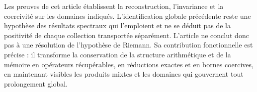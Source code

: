 Les preuves de cet article établissent la reconstruction, l'invariance et la coercivité sur les domaines indiqués. L'identification globale précédente reste une hypothèse des résultats spectraux qui l'emploient et ne se déduit pas de la positivité de chaque collection transportée séparément. L'article ne conclut donc pas à une résolution de l'hypothèse de Riemann. Sa contribution fonctionnelle est précise : il transforme la conservation de la structure arithmétique et de la mémoire en opérateurs récupérables, en réductions exactes et en bornes coercives, en maintenant visibles les produits mixtes et les domaines qui gouvernent tout prolongement global.
